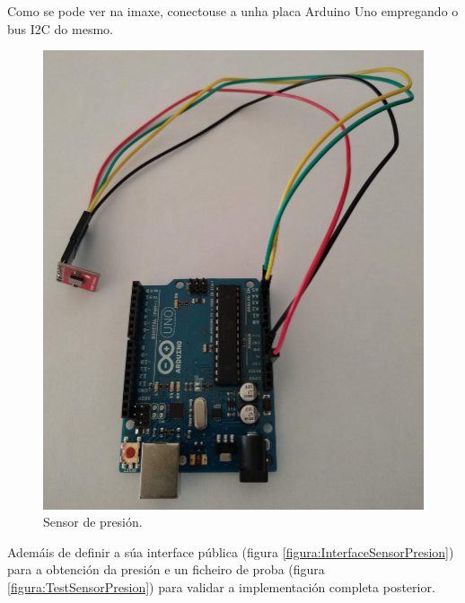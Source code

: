    Como se pode ver na imaxe, conectouse a unha placa Arduino Uno empregando
   o bus I2C do mesmo. \\
  
   \begin{figure}[htbp]
    \centering
    \includegraphics[scale=0.2,keepaspectratio=true]{./imagenes/sensor-presion.jpg}
    \caption{Sensor de presión.}
    \label{figura:SensorPresion}
   \end{figure}
   
   Ademáis de definir a súa interface pública (figura 
   \ref{figura:InterfaceSensorPresion}) para a obtención da presión e un
   ficheiro de proba (figura \ref{figura:TestSensorPresion}) para validar a
   implementación completa posterior. \\
   
